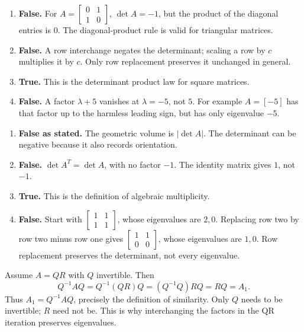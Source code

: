 \begin{enumerate}[label=(\alph*)]
\item \textbf{False.} For $A=\begin{bmatrix}0&1\\1&0\end{bmatrix}$,
$\det A=-1$, but the product of the diagonal entries is $0$.
The diagonal-product rule is valid for triangular matrices.
\item \textbf{False.} A row interchange negates the determinant;
scaling a row by $c$ multiplies it by $c$. Only row replacement
preserves it unchanged in general.
\item \textbf{True.} This is the determinant product law for square matrices.
\item \textbf{False.} A factor $\lambda+5$ vanishes at $\lambda=-5$,
not $5$. For example $A=[-5]$ has that factor up to the harmless
leading sign, but has only eigenvalue $-5$.
\end{enumerate}

\begin{enumerate}[label=(\alph*)]
\item \textbf{False as stated.} The geometric volume is $|\det A|$.
The determinant can be negative because it also records orientation.
\item \textbf{False.} $\det A^T=\det A$, with no factor $-1$.
The identity matrix gives $1$, not $-1$.
\item \textbf{True.} This is the definition of algebraic multiplicity.
\item \textbf{False.} Start with
$\begin{bmatrix}1&1\\1&1\end{bmatrix}$, whose eigenvalues are
$2,0$. Replacing row two by row two minus row one gives
$\begin{bmatrix}1&1\\0&0\end{bmatrix}$, whose eigenvalues are
$1,0$. Row replacement preserves the determinant, not every eigenvalue.
\end{enumerate}

Assume $A=QR$ with $Q$ invertible. Then
\[
 Q^{-1}AQ=Q^{-1}(QR)Q=(Q^{-1}Q)RQ=RQ=A_1.
\]
Thus $A_1=Q^{-1}AQ$, precisely the definition of similarity.
Only $Q$ needs to be invertible; $R$ need not be.
This is why interchanging the factors in the QR iteration preserves eigenvalues.

